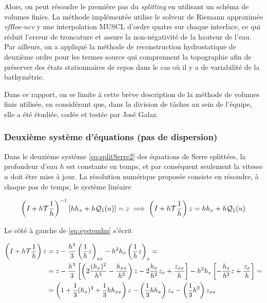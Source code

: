 \indent Alors, on peut résoudre le première pas du \emph{splitting} en utilisant un schéma de volumes finies. La méthode implémentée utilise le solveur de Riemann approximée \emph{vfRoe-ncv} y une interpolation MUSCL d'ordre quatre sur chaque interface, ce qui réduit l'erreur de troncature et assure la non-négativité de la hauteur de l'eau. Par ailleurs, on a appliqué la méthode de reconstruction hydrostatique de deuxième ordre pour les termes source qui comprennent la topographie afin de préserver des états stationnaires de repos dans le cas où il y a de variabilité de la bathymétrie.

\indent Dans ce rapport, on se limite à cette brève description de la méthode de volumes finis utilisée, en considérant que, dans la division de tâches au sein de l'équipe, elle a été étudiée, codée et testée par José Galaz.


\subsubsection{Deuxième système d'équations (pas de dispersion)}

\indent Dans le deuxième système \eqref{eq:splitSerre2} des équations de Serre splittées, la profondeur d'eau $h$ est constante en temps, et par conséquent seulement la vitesse $u$ doit être mise à jour.  La résolution numérique proposée consiste en résoudre, à chaque pas de temps, le système linéaire

\begin{equation}
	\label{eq:systemhu}
	\left(I + h\mathcal{T}\frac{1}{h} \right)^{-1}\left[ hh_x + h\mathcal{Q}_1(u) \right]  = z \implies \left(I + h\mathcal{T}\frac{1}{h} \right)z = hh_x + h\mathcal{Q}_1(u)
\end{equation}

\indent Le côté à gauche de \eqref{eq:systemhu} s'écrit

\begin{equation*}
\begin{aligned}
	 \left(I + h\mathcal{T}\frac{1}{h}\right)z  & =  z - \frac{h^3}{3}\left( \frac{1}{h} z\right)_{xx} - h^2h_x\left( \frac{1}{h} z\right)_x  = \\
						  & = z - \frac{h^3}{3}\left[ \left( 2\frac{(h_x)^2}{h^3} - \frac{h_{xx}}{h^2} \right)z - 2\frac{h_x}{h^2}z_x + \frac{z_{xx}}{h}	\right] - h^2h_x\left[ -\frac{h_x}{h^2}z + \frac{z_x}{h}\right] = \\
						  &  = \left( 1 + \frac{1}{3}(h_x)^2 + \frac{1}{3}hh_{xx}\right)z - \left(\frac{1}{3}hh_x\right)z_x - \left(\frac{1}{3}h^2\right)z_{xx}
\end{aligned}
\end{equation*}

